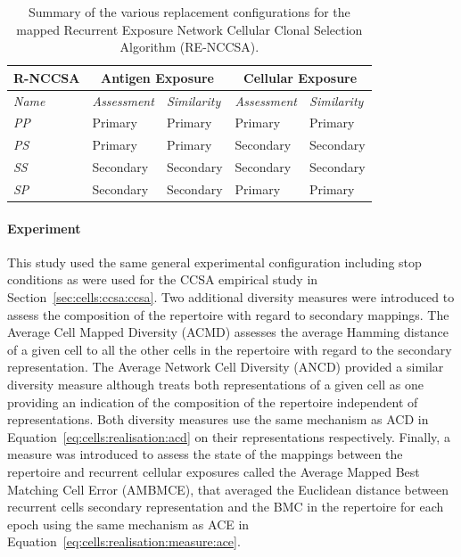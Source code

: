 \begin{table}[htp]
	\centering\small
		\begin{tabular}{lllll}
		\toprule
		\textbf{R-NCCSA} & \multicolumn{2}{c}{\textbf{Antigen Exposure}} & \multicolumn{2}{c}{\textbf{Cellular Exposure}} \\ 
		\midrule
		\emph{Name} & \emph{Assessment} & \emph{Similarity} & \emph{Assessment} & \emph{Similarity} \\ 
		\toprule
		\emph{PP} & Primary  & Primary  & Primary  & Primary  \\ 
		\emph{PS} & Primary  & Primary  & Secondary & Secondary \\ 
		\emph{SS} & Secondary & Secondary & Secondary & Secondary \\ 
		\emph{SP} & Secondary & Secondary & Primary  & Primary  \\ 
		\bottomrule
		\end{tabular}
	\caption{Summary of the various replacement configurations for the mapped Recurrent Exposure Network Cellular Clonal Selection Algorithm (RE-NCCSA).}
	\label{tab:network:nccsa:renccsa}
\end{table}


%
%
\paragraph{Experiment}
This study used the same general experimental configuration including stop conditions as were used for the CCSA empirical study in Section~\ref{sec:cells:ccsa:ccsa}. 
Two additional diversity measures were introduced to assess the composition of the repertoire with regard to secondary mappings. The Average Cell Mapped Diversity (ACMD) assesses the average Hamming distance of a given cell to all the other cells in the repertoire with regard to the secondary representation. The Average Network Cell Diversity (ANCD) provided a similar diversity measure although treats both representations of a given cell as one providing an indication of the composition of the repertoire independent of representations. Both diversity measures use the same mechanism as ACD in Equation~\ref{eq:cells:realisation:acd} on their representations respectively. Finally, a measure was introduced to assess the state of the mappings between the repertoire and recurrent cellular exposures called the Average Mapped Best Matching Cell Error (AMBMCE), that averaged the Euclidean distance between recurrent cells secondary representation and the BMC in the repertoire for each epoch using the same mechanism as ACE in Equation~\ref{eq:cells:realisation:measure:ace}.

